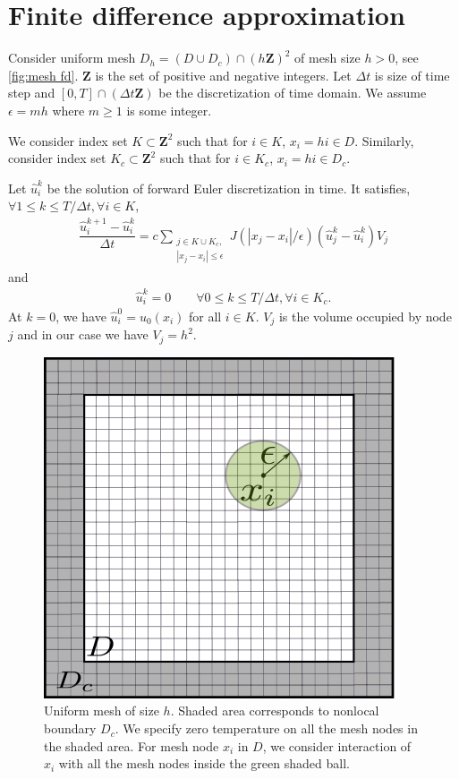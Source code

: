 \documentclass[11pt,twocolumn]{amsart}
\theoremstyle{definition}
\theoremstyle{definition}
\numberwithin{equation}{section}
\numberwithin{equation}{section}
\newcommand{\Z}{\mathbf{Z}}  %
\begin{document}
\section{Finite difference approximation}
Consider uniform mesh $D_h = (D\cup D_c)\cap (h\Z)^2$ of mesh size $h >0$, see \autoref{fig:mesh fd}. $\Z$ is the set of positive and negative integers. Let $\Delta t$ is size of time step and $[0,T]\cap (\Delta t \Z)$ be the discretization of time domain. We assume $\epsilon = m h$ where $m\geq 1$ is some integer.

We consider index set $K \subset \Z^2$ such that for $i\in K$, $x_i = h i \in D$. Similarly, consider index set $K_c \subset \Z^2$ such that for $i\in K_c$, $x_i = h i \in D_c$.

Let $\hat{u}^k_i$ be the solution of forward Euler discretization in time. It satisfies,$\forall 1\leq k \leq T/\Delta t, \forall i \in K$,
\begin{align}\label{eq:forward fd}
\dfrac{\hat{u}^{k+1}_i - \hat{u}^k_i}{\Delta t} = c \sum_{\substack{j \in K\cup K_c,\\
|x_j-x_i| \leq \epsilon}} J(|x_j - x_i|/\epsilon) (\hat{u}^k_j - \hat{u}^k_i) V_j
\end{align}
and
\begin{align}
\hat{u}^k_i = 0 \qquad \forall 0\leq k \leq T/\Delta t, \forall i \in K_c.
\end{align}
At $k=0$, we have $\hat{u}^0_i = u_0(x_i)$ for all $i\in K$. $V_j$ is the volume occupied by node $j$ and in our case we have $V_j = h^2$. 

\begin{figure}[ht]
\centering
\includegraphics[scale=0.6]{mesh_uniform.png}
\caption{Uniform mesh of size $h$. Shaded area corresponds to nonlocal boundary $D_c$. We specify zero temperature on all the mesh nodes in the shaded area. For mesh node $x_i$ in $D$, we consider interaction of $x_i$ with all the mesh nodes inside the green shaded ball.}\label{fig:mesh fd}
\end{figure}
\end{document}
